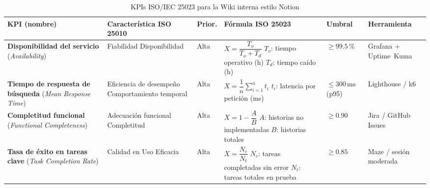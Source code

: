 \documentclass{report}
\begin{document}
\begin{table}[H]
  \centering
  \caption{KPIs ISO/IEC 25023 para la Wiki interna estilo Notion}
  \label{tab:kpis}
  \renewcommand{\arraystretch}{1.35}
  \small
  \begin{tabular}{%
      >{\raggedright\arraybackslash}p{}
      >{\raggedright\arraybackslash}p{}
      >{\centering\arraybackslash}p{}
      >{\raggedright\arraybackslash}p{}
      >{\centering\arraybackslash}p{}
      >{\raggedright\arraybackslash}p{}
    }
    \hline
    \textbf{KPI (nombre)} &
    \textbf{Característica ISO 25010} &
    \textbf{Prior.} &
    \textbf{Fórmula ISO 25023} &
    \textbf{Umbral} &
    \textbf{Herramienta} \\
    \hline

    \textbf{Disponibilidad del servicio}
    \newline (\textit{Availability}) &
    Fiabilidad \textrightarrow{} Disponibilidad &
    Alta &
    $X = \dfrac{T_o}{T_o + T_d}$
    \newline $T_o$: tiempo operativo (h)
    \newline $T_d$: tiempo caído (h) &
    $\geq 99.5\,\%$ &
    Grafana + Uptime~Kuma \\
    \hline

    \textbf{Tiempo de respuesta de búsqueda}
    \newline (\textit{Mean Response Time}) &
    Eficiencia de desempeño \textrightarrow{} Comportamiento temporal &
    Alta &
    $X = \dfrac{1}{n}\sum_{i=1}^{n} t_i$
    \newline $t_i$: latencia por petición (ms) &
    $\leq 300\,\text{ms}$ (p95) &
    Lighthouse / k6 \\
    \hline

    \textbf{Completitud funcional}
    \newline (\textit{Functional Completeness}) &
    Adecuación funcional \textrightarrow{} Completitud &
    Alta &
    $X = 1 - \dfrac{A}{B}$
    \newline $A$: historias no implementadas
    \newline $B$: historias totales &
    $\geq 0.90$ &
    Jira / GitHub Issues \\
    \hline

    \textbf{Tasa de éxito en tareas clave}
    \newline (\textit{Task Completion Rate}) &
    Calidad en Uso \textrightarrow{} Eficacia &
    Alta &
    $X = \dfrac{N_c}{N_t}$
    \newline $N_c$: tareas completadas sin error
    \newline $N_t$: tareas totales en prueba &
    $\geq 0.85$ &
    Maze / sesión moderada \\
    \hline


\end{tabular}
\end{table}
\end{document}
